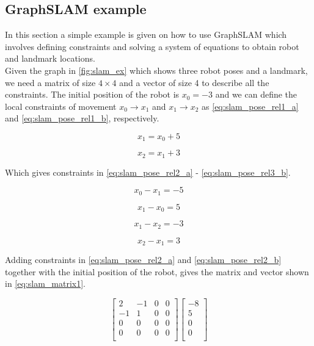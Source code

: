 \subsection{GraphSLAM example}

In this section a simple example is given on how to use GraphSLAM which involves defining constraints and solving a system of equations to obtain robot and landmark locations.\\

Given the graph in \autoref{fig:slam_ex} which shows three robot poses and a landmark, we need a matrix of size $4\times4$ and a vector of size 4 to describe all the constraints. The initial position of the robot is $x_0 = -3$ and we can define the local constraints of movement $x_0 \rightarrow x_1$ and $x_1 \rightarrow x_2$ as \autoref{eq:slam_pose_rel1_a} and \ref{eq:slam_pose_rel1_b}, respectively.

\begin{equation}
\label{eq:slam_pose_rel1_a}
x_1 = x_0 + 5
\end{equation}

\begin{equation}
\label{eq:slam_pose_rel1_b}
x_2 = x_1 + 3
\end{equation}

Which gives constraints in \autoref{eq:slam_pose_rel2_a} - \ref{eq:slam_pose_rel3_b}.

\begin{equation}
\label{eq:slam_pose_rel2_a}
x_0 - x_1 = -5
\end{equation}

\begin{equation}
\label{eq:slam_pose_rel2_b}
x_1 - x_0 = 5
\end{equation}

\begin{equation}
\label{eq:slam_pose_rel3_a}
x_1 - x_2 = -3
\end{equation}

\begin{equation}
\label{eq:slam_pose_rel3_b}
x_2 - x_1 = 3
\end{equation}

Adding constraints in \autoref{eq:slam_pose_rel2_a} and \ref{eq:slam_pose_rel2_b} together with the initial position of the robot, gives the matrix and vector shown in \autoref{eq:slam_matrix1}.

\begin{equation}
\label{eq:slam_matrix1}
\begin{bmatrix}
2 & -1 & 0 & 0 \\
-1 & 1 & 0 & 0 \\
0 & 0 & 0 & 0 \\
0 & 0 & 0 & 0 \\
\end{bmatrix}
\begin{bmatrix}
-8 \\
5 \\
0 \\
0 \\
\end{bmatrix}
\end{equation}


